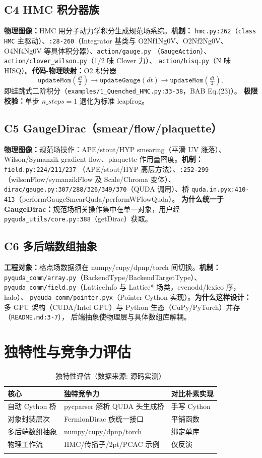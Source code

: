 \documentclass[UTF8]{ctexart}
\begin{document}
\subsection{C4 HMC 积分器族}
\textbf{物理图像：}HMC 用分子动力学积分生成规范场系综。\textbf{机制：}
\texttt{hmc.py:262}（\texttt{class HMC} 主驱动）、\texttt{:28-260}（Integrator 基类与
O2Nf1Ng0V、O2Nf2Ng0V、O4Nf4Ng0V 等具体积分器）、\texttt{action/gauge.py}
（\texttt{GaugeAction}）、\texttt{action/clover\_wilson.py}（1/2 味 Clover 力）、
\texttt{action/hisq.py}（N 味 HISQ）。\textbf{代码-物理映射：}O2 积分器
\begin{equation}\label{eq:o2}
\texttt{updateMom}(\tfrac{dt}{2}) \to \texttt{updateGauge}(dt) \to \texttt{updateMom}(\tfrac{dt}{2}),
\end{equation}
即蛙跳式二阶积分（\texttt{examples/1\_Quenched\_HMC.py:33-38}，BAB Eq.(23)）。
\textbf{极限校验：}单步 $n\_steps=1$ 退化为标准 leapfrog。

\subsection{C5 GaugeDirac（smear/flow/plaquette）}
\textbf{物理图像：}规范场操作：APE/stout/HYP smearing（平滑 UV 涨落）、Wilson/Symanzik
gradient flow、plaquette 作用量密度。\textbf{机制：}\texttt{field.py:224/211/237}
（APE/stout/HYP 高层方法）、\texttt{:252-299}（wilsonFlow/symanzikFlow 及 Scale/Chroma
变体）、\texttt{dirac/gauge.py:307/288/326/349/370}（QUDA 调用）、桥
\texttt{quda.in.pyx:410-413}（performGaugeSmearQuda/performWFlowQuda）。
\textbf{为什么统一于 GaugeDirac：}规范场相关操作集中在单一对象，用户经
\texttt{pyquda\_utils/core.py:388}（getDirac）获取。

\subsection{C6 多后端数组抽象}
\textbf{工程对象：}格点场数据须在 numpy/cupy/dpnp/torch 间切换。\textbf{机制：}
\texttt{pyquda\_comm/array.py}（BackendType/BackendTargetType）、
\texttt{pyquda\_comm/field.py}（LatticeInfo 与 Lattice* 场类，evenodd/lexico 序，halo）、
\texttt{pyquda\_comm/pointer.pyx}（Pointer Cython 实现）。\textbf{为什么这样设计：}
多 GPU 架构（CUDA/Intel GPU）与 Python 生态（CuPy/PyTorch）并存（\texttt{README.md:3-7}），
后端抽象使物理层与具体数组库解耦。

\section{独特性与竞争力评估}
\begin{xltabular}{\textwidth}{lXX}
\toprule
\textcolor{algo}{核心} & 独特竞争力 & 对比朴素实现 \\
\midrule
\endhead
自动 Cython 桥 & pycparser 解析 QUDA 头生成桥 & 手写 Cython \\
对象封装层次 & FermionDirac 族统一接口 & 平铺函数 \\
多后端数组抽象 & numpy/cupy/dpnp/torch & 绑定单库 \\
物理工作流 & HMC/传播子/2pt/PCAC 示例 & 仅反演 \\
\bottomrule
\caption{独特性评估（数据来源: 源码实测）}
\end{xltabular}
\end{document}

